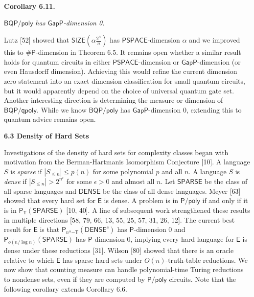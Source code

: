 

\par\medskip\noindent\textbf{
\textbf{Corollary 6.11}\textbf{.}
}\par



$\mathsf{BQP}/\mathsf{poly}$\emph{ has $\mathsf{GapP}$-dimension 0.}\par






Lutz [52] showed that $\mathsf{SIZE}\!(\alpha\frac{2^{n}}{n})$ has $\mathsf{PSPACE}$-dimension $\alpha$ and we improved this to ${\mathsf{\#}\mathsf{P}}$-dimension in Theorem 6.5. It remains open whether a similar result holds for quantum circuits in either $\mathsf{PSPACE}$-dimension or $\mathsf{GapP}$-dimension (or even Hausdorff dimension). Achieving this would refine the current dimension zero statement into an exact dimension classification for small quantum circuits, but it would apparently depend on the choice of universal quantum gate set.
Another interesting direction is determining the measure or dimension of $\mathsf{BQP}/\mathsf{qpoly}$. While we know $\mathsf{BQP}/\mathsf{poly}$ has $\mathsf{GapP}$-dimension 0, extending this to quantum advice remains open.\par






\par\medskip\noindent\textbf{
6.3 Density of Hard Sets}\par




Investigations of the density of hard sets for complexity classes began with motivation from the Berman-Hartmanis Isomorphism Conjecture [10].
A language $S$ is \emph{sparse} if $|S_{\leq n}|\leq p(n)$ for some polynomial $p$ and all $n$.
A language $S$ is \emph{dense} if $|S_{\leq n}|>2^{n^{\epsilon}}$ for some $\epsilon>0$ and almost all $n$.
Let $\mathsf{SPARSE}$ be the class of all sparse languages and $\mathsf{DENSE}$ be the class of all dense languages.
Meyer [63] showed that every hard set for $\mathsf{E}$ is dense.
A problem is in ${\mathsf{P}/\mathsf{poly}}$ if and only if it is in $\mathsf{P}_{\mathsf{T}}(\mathsf{SPARSE})$ [10, 40].
A line of subsequent work strengthened these results in multiple directions
[58, 79, 66, 13, 55, 25, 57, 31, 26, 12].
The current best result for $\mathsf{E}$ is that
$\mathsf{P}_{n^{\alpha}\mathsf{-T}}(\mathsf{DENSE}^{c})$ has $\mathsf{P}$-dimension 0
and $\mathsf{P}_{o(n/\log n)}(\mathsf{SPARSE})$ has $\mathsf{P}$-dimension 0, implying every hard language for $\mathsf{E}$ is dense under these reductions [31]. Wilson [80] showed that there is an oracle relative to which $\mathsf{E}$ has sparse hard sets under $O(n)$-truth-table reductions.
We now show that counting measure can handle polynomial-time Turing reductions to nondense sets, even if they are computed by ${\mathsf{P}/\mathsf{poly}}$ circuits.
Note that the following corollary extends Corollary 6.6.\par




